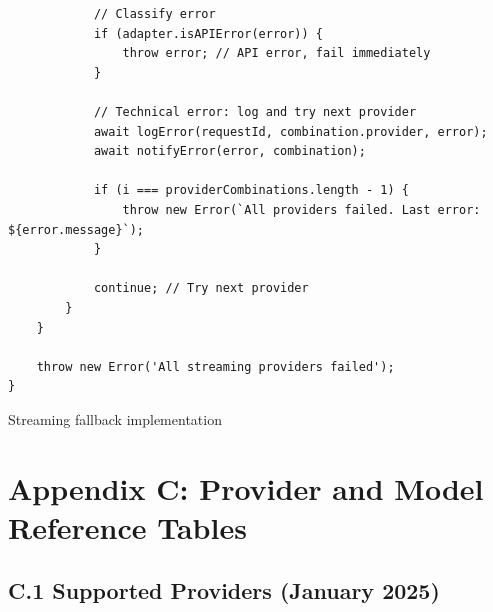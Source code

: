 \documentclass[english]{article}
\begin{document}
\begin{listing}[H]
\begin{verbatim}
            // Classify error
            if (adapter.isAPIError(error)) {
                throw error; // API error, fail immediately
            }

            // Technical error: log and try next provider
            await logError(requestId, combination.provider, error);
            await notifyError(error, combination);

            if (i === providerCombinations.length - 1) {
                throw new Error(`All providers failed. Last error: ${error.message}`);
            }

            continue; // Try next provider
        }
    }

    throw new Error('All streaming providers failed');
}
\end{verbatim}
\caption{Streaming fallback implementation}
\end{listing}

\newpage
\section*{Appendix C: Provider and Model Reference Tables}

\subsection*{C.1 Supported Providers (January 2025)}
\end{document}
